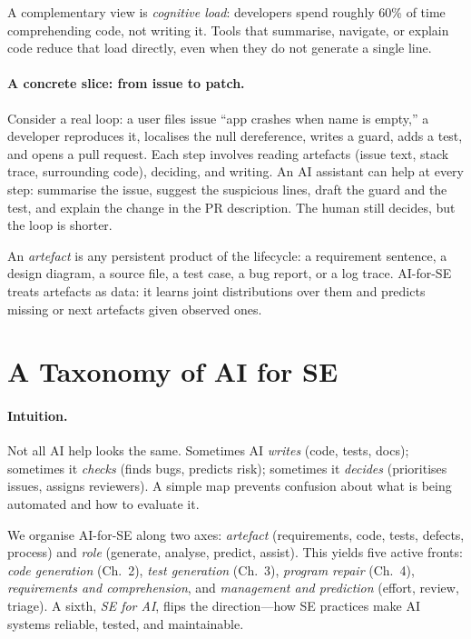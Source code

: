 A complementary view is \emph{cognitive load}: developers spend roughly 60\% of time comprehending code, not writing it. Tools that summarise, navigate, or explain code reduce that load directly, even when they do not generate a single line.

\paragraph{A concrete slice: from issue to patch.} Consider a real loop: a user files issue ``app crashes when name is empty,'' a developer reproduces it, localises the null dereference, writes a guard, adds a test, and opens a pull request. Each step involves reading artefacts (issue text, stack trace, surrounding code), deciding, and writing. An AI assistant can help at every step: summarise the issue, suggest the suspicious lines, draft the guard and the test, and explain the change in the PR description. The human still decides, but the loop is shorter.

\begin{definition}[SE artefact]
An \emph{artefact} is any persistent product of the lifecycle: a requirement sentence, a design diagram, a source file, a test case, a bug report, or a log trace. AI-for-SE treats artefacts as data: it learns joint distributions over them and predicts missing or next artefacts given observed ones.
\end{definition}

\section{A Taxonomy of AI for SE}
\label{sec:taxonomy}
\paragraph{Intuition.} Not all AI help looks the same. Sometimes AI \emph{writes} (code, tests, docs); sometimes it \emph{checks} (finds bugs, predicts risk); sometimes it \emph{decides} (prioritises issues, assigns reviewers). A simple map prevents confusion about what is being automated and how to evaluate it.

We organise AI-for-SE along two axes: \emph{artefact} (requirements, code, tests, defects, process) and \emph{role} (generate, analyse, predict, assist). This yields five active fronts: \emph{code generation} (Ch.~2), \emph{test generation} (Ch.~3), \emph{program repair} (Ch.~4), \emph{requirements and comprehension}, and \emph{management and prediction} (effort, review, triage). A sixth, \emph{SE for AI}, flips the direction---how SE practices make AI systems reliable, tested, and maintainable.


